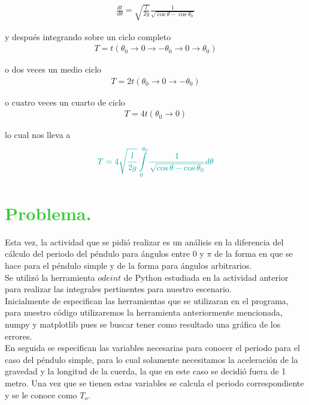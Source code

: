 \documentclass[12pt]{article}
\begin{document}
\begin{eqnarray*}
\frac{dt}{d \theta} = \sqrt{\frac{l}{2g}} \frac{1}{\sqrt{\cos\theta -  \cos\theta_0}}
\end{eqnarray*}

y después integrando sobre un ciclo completo
\begin{eqnarray*}
T = t(\theta_0 \to 0 \to -\theta_0 \to 0 \to \theta_0)
\end{eqnarray*}

o dos veces un medio ciclo
\begin{eqnarray*}
T=2t(\theta_0 \to 0 \to -\theta_0)
\end{eqnarray*}

o cuatro veces un cuarto de ciclo
\begin{eqnarray*}
T=4t(\theta_0 \to 0)
\end{eqnarray*}

lo cual nos lleva a
\begin{eqnarray*}
\textcolor{Emerald}{T=4 \sqrt{\frac{l}{2g}}\int\limits_0^{\theta_0} \frac{1}{\sqrt{\cos\theta - \cos\theta_0}} d\theta}
\end{eqnarray*}


\pagebreak
\section*{\textcolor{LimeGreen}{Problema.}}
Esta vez, la actividad que se pidió realizar es un análisis en la diferencia del cálculo del periodo del péndulo para ángulos entre 0 y $\pi$ de la forma en que se hace para el péndulo simple y de la forma para ángulos arbitrarios.\\
Se utilizó la herramienta $odeint$ de Python estudiada en la actividad anterior para realizar las integrales pertinentes para nuestro escenario.\\

Inicialmente de especifican las herramientas que se utilizaran en el programa, para nuestro código utilizaremos la herramienta anteriormente mencionada, numpy y matplotlib pues se buscar tener como resultado una gráfica de los errores.\\

En seguida se especifican las variables necesarias para conocer el periodo para el caso del péndulo simple, para lo cual solamente necesitamos la aceleración de la gravedad y la longitud de la cuerda, la que en este caso se decidió fuera de 1 metro. Una vez que se tienen estas variables se calcula el periodo correspondiente y se le conoce como $T_o$.\\
\end{document}
